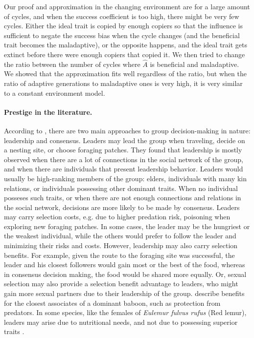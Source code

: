 \documentclass[12pt]{extarticle}
\begin{document}
Our proof and approximation in the changing environment are for a large amount of cycles, and when the success coefficient is too high, there might be very few cycles. Either the ideal trait is copied by enough copiers so that the influence is sufficient to negate the success bias when the cycle changes (and the beneficial trait becomes the maladaptive), or the opposite happens, and the ideal trait gets extinct before there were enough copiers that copied it.
We then tried to change the ratio between the number of cycles where $\hat{A}$ is beneficial and maladaptive. We showed that the approximation fits well regardless of the ratio, but when the ratio of adaptive generations to maladaptive ones is very high, it is very similar to a constant environment model.

\paragraph{Prestige in the literature.}

According to \citet{animal_leadership}, there are two main approaches to group decision-making in nature: leadership and consensus.
Leaders may lead the group when traveling, decide on a nesting site, or choose foraging patches. They found that leadership is mostly observed when there are a lot of connections in the social network of the group, and when there are individuals that present leadership behavior.
Leaders would usually be high-ranking members of the group: elders, individuals with many kin relations, or individuals possessing other dominant traits.
When no individual posseses such traits, or when there are not enough connections and relations in the social network, decisions are more likely to be made by consensus.
Leaders may carry selection costs, e.g. due to higher predation risk, poisoning when exploring new foraging patches.
In some cases, the leader may be the hungriest or the weakest individual, while the others would prefer to follow the leader and minimizing their risks and costs.
However, leadership may also carry selection benefits. For example, given the route to the foraging site was successful, the leader and his closest followers would gain most or the best of the food, whereas in consensus decision making, the food would be shared more equally. Or, sexual selection may also provide a selection benefit advantage to leaders, who might gain more sexual partners due to their leadership of the group. \citet{animal_leadership} describe benefits for the closest associates of a dominant baboon, such as protection from predators. 
In some species, like the females of \textit{Eulemur fulvus rufus} (Red lemur), leaders may arise due to nutritional needs, and not due to possessing superior traits \citep{lemurs}.
\end{document}
